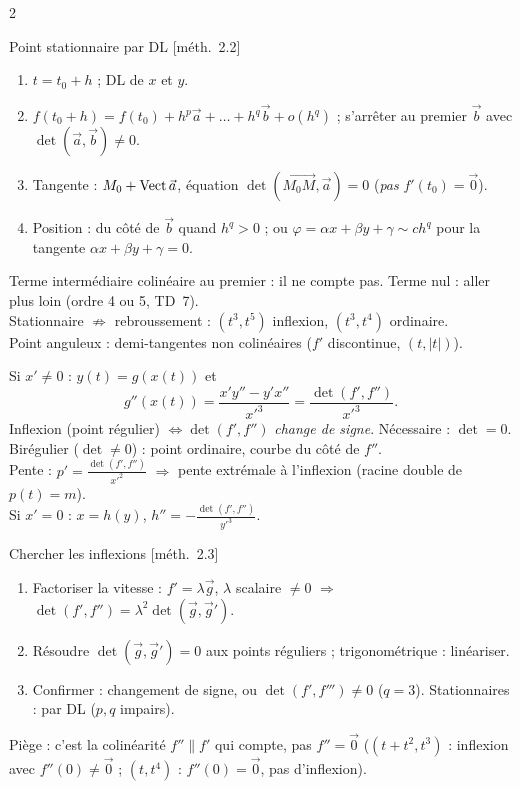\documentclass[a4paper,10pt]{article}
\newcommand{\vv}[1]{\overrightarrow{#1}}\newcommand{\ve}[1]{\vec{#1}}
\newcommand{\livre}[1]{{\sffamily\scriptsize\color{Gris}[#1]}}
\begin{document}
\begin{multicols}{2}
\begin{METH}{Point stationnaire par DL \livre{méth.~2.2}}
\begin{enumerate}
\item $t=t_0+h$ ; DL de $x$ et $y$.
\item $f(t_0+h)=f(t_0)+h^p\ve a+\dots+h^q\ve b+o(h^q)$ ; s'arrêter au premier $\ve b$ avec $\det(\ve a,\ve b)\neq0$.
\item Tangente : $M_0+\vect\ve a$, équation $\det(\vv{M_0M},\ve a)=0$ (\emph{pas} $f'(t_0)=\ve0$).
\item Position : du côté de $\ve b$ quand $h^q>0$ ; ou $\varphi=\alpha x+\beta y+\gamma\sim ch^q$ pour la tangente $\alpha x+\beta y+\gamma=0$.
\end{enumerate}
\end{METH}

\begin{PIEGE}
Terme intermédiaire colinéaire au premier : il ne compte pas. Terme nul : aller plus loin (ordre 4 ou 5, TD~7).\\
Stationnaire $\not\Rightarrow$ rebroussement : $(t^3,t^5)$ inflexion, $(t^3,t^4)$ ordinaire.\\
Point anguleux : demi-tangentes non colinéaires ($f'$ discontinue, $(t,|t|)$).
\end{PIEGE}

\begin{FORM}[INFLEXION ET $\det(f',f'')$ \livre{§2.4}]
Si $x'\neq0$ : $y(t)=g(x(t))$ et
\[g''(x(t))=\frac{x'y''-y'x''}{x'^3}=\frac{\det(f',f'')}{x'^3}.\]
Inflexion (point régulier) $\iff\det(f',f'')$ \emph{change de signe}. Nécessaire : $\det=0$.\\
Birégulier ($\det\neq0$) : point ordinaire, courbe du côté de $f''$.\\
Pente : $p'=\frac{\det(f',f'')}{x'^2}$ $\Rightarrow$ pente extrémale à l'inflexion (racine double de $p(t)=m$).\\
Si $x'=0$ : $x=h(y)$, $h''=-\frac{\det(f',f'')}{y'^3}$.
\end{FORM}

\begin{METH}{Chercher les inflexions \livre{méth.~2.3}}
\begin{enumerate}
\item Factoriser la vitesse : $f'=\lambda\ve g$, $\lambda$ scalaire $\neq0$ $\Rightarrow$ $\det(f',f'')=\lambda^2\det(\ve g,\ve g')$.
\item Résoudre $\det(\ve g,\ve g')=0$ aux points réguliers ; trigonométrique : linéariser.
\item Confirmer : changement de signe, ou $\det(f',f''')\neq0$ ($q=3$). Stationnaires : par DL ($p,q$ impairs).
\end{enumerate}
Piège : c'est la colinéarité $f''\parallel f'$ qui compte, pas $f''=\ve0$ ($(t+t^2,t^3)$ : inflexion avec $f''(0)\neq\ve0$ ;
$(t,t^4)$ : $f''(0)=\ve0$, pas d'inflexion).
\end{METH}


\end{multicols}
\end{document}
